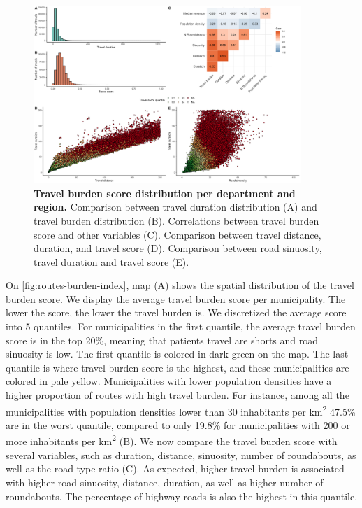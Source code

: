 \begin{figure}[h!]
    \includegraphics[width=0.9\textwidth]{images/routes/sup_fig_3.png}
    \centering
    \caption{
        \textbf{Travel burden score distribution per department and region.}
        Comparison between travel duration distribution (A) and travel burden
        distribution (B). Correlations between travel burden score and other
        variables (C). Comparison between travel distance, duration, and travel
        score (D). Comparison between road sinuosity, travel duration and travel
        score (E).}
    \label{fig:routes-burden-distribution}
\end{figure}

On \cref{fig:routes-burden-index}, map (A) shows the spatial distribution
of the travel burden score. We display the average travel burden score per
municipality. The lower the score, the lower the travel burden is. We
discretized the average score into 5 quantiles. For municipalities in the first
quantile, the average travel burden score is in the top 20\%, meaning that
patients travel are shorts and road sinuosity is low. The first quantile is
colored in dark green on the map. The last quantile is where travel burden score
is the highest, and these municipalities are colored in pale yellow.
Municipalities with lower population densities have a higher proportion of
routes with high travel burden. For instance, among all the municipalities with
population densities lower than 30 inhabitants per km\textsuperscript{2} 47.5\%
are in the worst quantile, compared to only 19.8\% for municipalities with 200
or more inhabitants per km\textsuperscript{2} (B). We now compare the travel
burden score with several variables, such as duration, distance, sinuosity,
number of roundabouts, as well as the road type ratio (C). As expected, higher
travel burden is associated with higher road sinuosity, distance, duration, as
well as higher number of roundabouts. The percentage of highway roads is also
the highest in this quantile.

